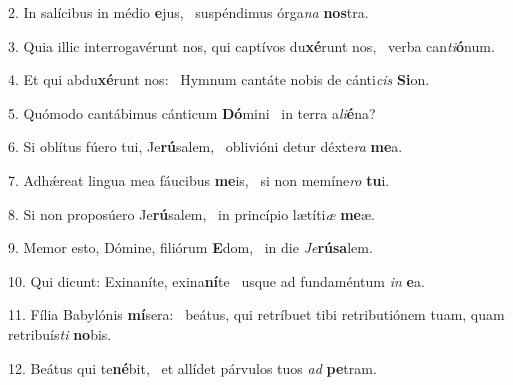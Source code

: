 2. In salícibus in médio \textbf{e}jus, \ast\  suspéndimus órga\textit{na} \textbf{nos}tra.\

3. Quia illic interrogavérunt nos, qui captívos du\textbf{xé}runt nos, \ast\  verba can\textit{ti}\textbf{ó}num.\

4. Et qui abdu\textbf{xé}runt nos: \ast\  Hymnum cantáte nobis de cánti\textit{cis} \textbf{Si}on.\

5. Quómodo cantábimus cánticum \textbf{Dó}mini \ast\  in terra a\textit{li}\textbf{é}na?\

6. Si oblítus fúero tui, Je\textbf{rú}salem, \ast\  oblivióni detur déxte\textit{ra} \textbf{me}a.\

7. Adhǽreat lingua mea fáucibus \textbf{me}is, \ast\  si non memíne\textit{ro} \textbf{tu}i.\

8. Si non proposúero Je\textbf{rú}salem, \ast\  in princípio lætíti\textit{æ} \textbf{me}æ.\

9. Memor esto, Dómine, filiórum \textbf{E}dom, \ast\  in die \textit{Je}\textbf{rú}\textbf{sa}lem.\

10. Qui dicunt: Exinaníte, exina\textbf{ní}te \ast\  usque ad fundaméntum \textit{in} \textbf{e}a.\

11. Fília Babylónis \textbf{mí}sera: \ast\  beátus, qui retríbuet tibi retributiónem tuam, quam retribuís\textit{ti} \textbf{no}bis.\

12. Beátus qui te\textbf{né}bit, \ast\  et allídet párvulos tuos \textit{ad} \textbf{pe}tram.\

